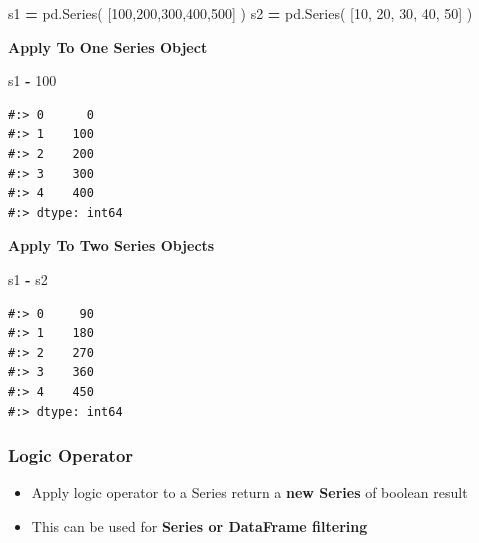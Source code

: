 \documentclass[
]{book}
\newenvironment{Shaded}{\begin{snugshade}}{\end{snugshade}}
\newcommand{\DecValTok}[1]{\textcolor[rgb]{0.06,0.06,0.06}{#1}}
\newcommand{\NormalTok}[1]{#1}
\newcommand{\OperatorTok}[1]{\textcolor[rgb]{0.43,0.43,0.43}{\textbf{#1}}}
\providecommand{\tightlist}{%
  \setlength{\itemsep}{0pt}\setlength{\parskip}{0pt}}
\begin{document}
\begin{Shaded}
\begin{Highlighting}[]
\NormalTok{s1 }\OperatorTok{=}\NormalTok{ pd.Series( [}\DecValTok{100}\NormalTok{,}\DecValTok{200}\NormalTok{,}\DecValTok{300}\NormalTok{,}\DecValTok{400}\NormalTok{,}\DecValTok{500}\NormalTok{] )}
\NormalTok{s2 }\OperatorTok{=}\NormalTok{ pd.Series( [}\DecValTok{10}\NormalTok{, }\DecValTok{20}\NormalTok{, }\DecValTok{30}\NormalTok{, }\DecValTok{40}\NormalTok{, }\DecValTok{50}\NormalTok{] )}
\end{Highlighting}
\end{Shaded}

\textbf{Apply To One Series Object}

\begin{Shaded}
\begin{Highlighting}[]
\NormalTok{s1 }\OperatorTok{-} \DecValTok{100}
\end{Highlighting}
\end{Shaded}

\begin{verbatim}
#:> 0      0
#:> 1    100
#:> 2    200
#:> 3    300
#:> 4    400
#:> dtype: int64
\end{verbatim}

\textbf{Apply To Two Series Objects}

\begin{Shaded}
\begin{Highlighting}[]
\NormalTok{s1 }\OperatorTok{-}\NormalTok{ s2}
\end{Highlighting}
\end{Shaded}

\begin{verbatim}
#:> 0     90
#:> 1    180
#:> 2    270
#:> 3    360
#:> 4    450
#:> dtype: int64
\end{verbatim}

\hypertarget{logic-operator}{%
\subsubsection{Logic Operator}\label{logic-operator}}

\begin{itemize}
\tightlist
\item
  Apply logic operator to a Series return a \textbf{new Series} of boolean result\\
\item
  This can be used for \textbf{Series or DataFrame filtering}
\end{itemize}
\end{document}
